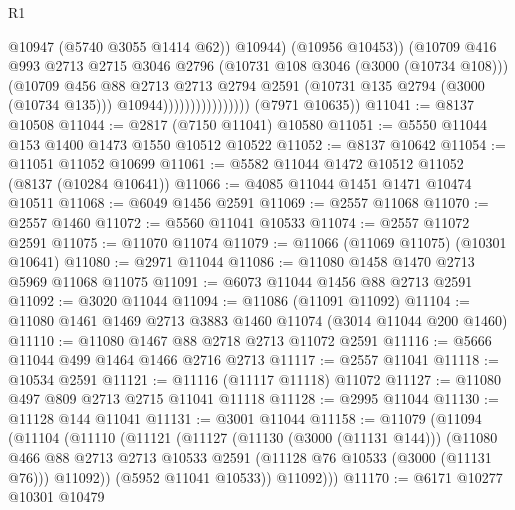 \begin{lexlean}{R1}
\begin{coremodule}
                                        @10947
                                        (@5740 @3055 @1414 @62))
                                      @10944)
                                    (@10956 @10453))
                                  (@10709
                                    @416
                                    @993
                                    @2713
                                    @2715
                                    @3046
                                    @2796
                                    (@10731 @108 @3046 (@3000 (@10734 @108)))
                                    (@10709
                                      @456
                                      @88
                                      @2713
                                      @2713
                                      @2794
                                      @2591
                                      (@10731 @135 @2794 (@3000 (@10734 @135)))
                                      @10944))))))))))))))))
      (@7971 @10635))
@11041 := @8137 @10508
@11044 := @2817 (@7150 @11041) @10580
@11051 := @5550 @11044 @153 @1400 @1473 @1550 @10512 @10522
@11052 := @8137 @10642
@11054 := @11051 @11052 @10699
@11061 := @5582 @11044 @1472 @10512 @11052 (@8137 (@10284 @10641))
@11066 := @4085 @11044 @1451 @1471 @10474 @10511
@11068 := @6049 @1456 @2591
@11069 := @2557 @11068
@11070 := @2557 @1460
@11072 := @5560 @11041 @10533
@11074 := @2557 @11072 @2591
@11075 := @11070 @11074
@11079 := @11066 (@11069 @11075) (@10301 @10641)
@11080 := @2971 @11044
@11086 := @11080 @1458 @1470 @2713 @5969 @11068 @11075
@11091 := @6073 @11044 @1456 @88 @2713 @2591
@11092 := @3020 @11044
@11094 := @11086 (@11091 @11092)
@11104 := @11080 @1461 @1469 @2713 @3883 @1460 @11074 (@3014 @11044 @200 @1460)
@11110 := @11080 @1467 @88 @2718 @2713 @11072 @2591
@11116 := @5666 @11044 @499 @1464 @1466 @2716 @2713
@11117 := @2557 @11041
@11118 := @10534 @2591
@11121 := @11116 (@11117 @11118) @11072
@11127 := @11080 @497 @809 @2713 @2715 @11041 @11118
@11128 := @2995 @11044
@11130 := @11128 @144 @11041
@11131 := @3001 @11044
@11158 := @11079
    (@11094
      (@11104
        (@11110
          (@11121
            (@11127
              (@11130 (@3000 (@11131 @144)))
              (@11080
                @466
                @88
                @2713
                @2713
                @10533
                @2591
                (@11128 @76 @10533 (@3000 (@11131 @76)))
                @11092))
            (@5952 @11041 @10533))
          @11092)))
@11170 := @6171
    @10277
    @10301
    @10479

\end{coremodule}
\end{lexlean}
